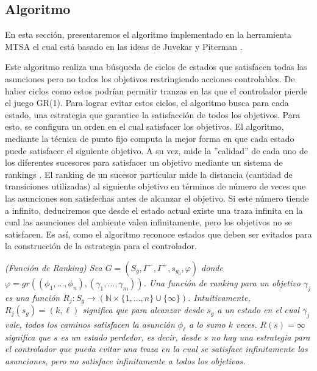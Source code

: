 \subsection{Algoritmo}

En esta sección, presentaremos el algoritmo implementado en la herramienta MTSA \cite{4639371} el cual está basado en las
ideas de Juvekar y Piterman \cite{Juvekar:buchi}.

Este algoritmo realiza una búsqueda de ciclos de estados que satisfacen todas las asunciones pero no todos los objetivos
restringiendo acciones controlables. De haber ciclos como estos podrían permitir tranzas en las que el controlador
pierde el juego GR(1). Para lograr evitar estos ciclos, el algoritmo busca para cada estado, una estrategia que
garantice la satisfacción de todos los objetivos. Para esto, se configura un orden en el cual satisfacer los objetivos.
El algoritmo, mediante la técnica de punto fijo computa la mejor forma en que cada estado puede satisfacer el siguiente
objetivo. A su vez, mide la ''calidad'' de cada uno de los diferentes sucesores para satisfacer un objetivo mediante un
sistema de rankings \cite{Jurdzinski:ParityGames}. El ranking de un sucesor particular mide la distancia (cantidad de transiciones utilizadas)
al siguiente objetivo en términos de número de veces que las asunciones son satisfechas antes de alcanzar el objetivo.
Si este número tiende a infinito, deduciremos que desde el estado actual existe una traza infinita en la cual las
asunciones del ambiente valen infinitamente, pero los objetivos no se satisfacen. Es así, como el algoritmo reconoce
estados que deben ser evitados para la construcción de la estrategia para el controlador.

\begin{nahaDef}
    \emph{(Función de Ranking) Sea $G = (S_g,\Gamma^-,\Gamma^+,s_{g_0},\varphi)$ donde \\$\varphi = 
    gr(( \phi_1 ,..., \phi_n ),( \gamma_1 ,..., \gamma_m ) )$. Una función de ranking para un objetivo $\gamma_j$ es una función
    $R_j : S_g \rightarrow (\mathbb{N} \times \{1,...,n\}\cup\{\infty\})$. Intuitivamente, $R_j(s_g) = (k,\ell)$
    significa que para alcanzar desde $s_g$ a un estado en el cual $\gamma_j$ vale, todos los caminos satisfacen
    la asunción $\phi_{\ell}$ a lo sumo $k$ veces. $R(s) = \infty$ significa que $s$ es un estado perdedor, es decir,
    desde $s$ no hay una estrategia para el controlador que pueda evitar una traza en la cual se satisface infinitamente
    las asunciones, pero no satisface infinitamente a todos los objetivos.}
\end{nahaDef}


